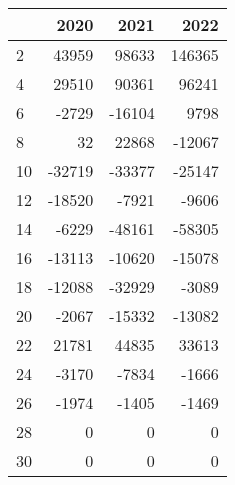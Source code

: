 \begin{tabular}{lrrr}
\toprule
{} &   2020 &   2021 &    2022 \\
\midrule
2  &  43959 &  98633 &  146365 \\
4  &  29510 &  90361 &   96241 \\
6  &  -2729 & -16104 &    9798 \\
8  &     32 &  22868 &  -12067 \\
10 & -32719 & -33377 &  -25147 \\
12 & -18520 &  -7921 &   -9606 \\
14 &  -6229 & -48161 &  -58305 \\
16 & -13113 & -10620 &  -15078 \\
18 & -12088 & -32929 &   -3089 \\
20 &  -2067 & -15332 &  -13082 \\
22 &  21781 &  44835 &   33613 \\
24 &  -3170 &  -7834 &   -1666 \\
26 &  -1974 &  -1405 &   -1469 \\
28 &      0 &      0 &       0 \\
30 &      0 &      0 &       0 \\
\bottomrule
\end{tabular}
